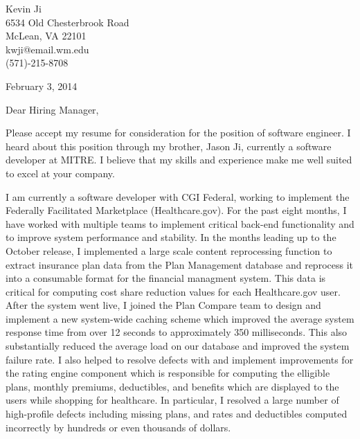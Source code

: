 \documentclass[10pt, letterpaper]{letter}
\begin{document}
 

\begin{flushright} 
Kevin Ji \\
6534 Old Chesterbrook Road \\
McLean, VA 22101 \\
kwji@email.wm.edu \\
(571)-215-8708

February 3, 2014
\end{flushright}

Dear Hiring Manager,

Please accept my resume for consideration for the position of software engineer. I heard about this position through my brother, Jason Ji, currently a software developer at MITRE. I believe that my skills and experience make me well suited to excel at your company.

I am currently a software developer with CGI Federal, working to implement the Federally Facilitated Marketplace (Healthcare.gov). For the past eight months, I have worked with multiple teams to implement critical back-end functionality and to improve system performance and stability. In the months leading up to the October release, I implemented a large scale content reprocessing function to extract insurance plan data from the Plan Management database and reprocess it into a consumable format for the financial managment system. This data is critical for computing cost share reduction values for each Healthcare.gov user. After the system went live, I joined the Plan Compare team to design and implement a new system-wide caching scheme which improved the average system response time from over 12 seconds to approximately 350 milliseconds. This also substantially reduced the average load on our database and improved the system failure rate. I also helped to resolve defects with and implement improvements for the rating engine component which is responsible for computing the elligible plans, monthly premiums, deductibles, and benefits which are displayed to the users while shopping for healthcare. In particular, I resolved a large number of high-profile defects including missing plans, and rates and deductibles computed incorrectly by hundreds or even thousands of dollars. 

\end{document}
